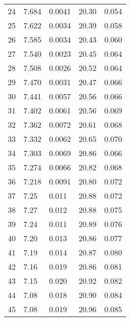 \begin{table}
\begin{tabular}{c|ll|ll}
24 & 7.684 & 0.0041 & 20.30 & 0.054 \\
25 & 7.622 & 0.0034 & 20.39 & 0.058 \\
26 & 7.585 & 0.0034 & 20.43 & 0.060 \\
27 & 7.540 & 0.0023 & 20.45 & 0.064 \\
28 & 7.508 & 0.0026 & 20.52 & 0.064 \\
29 & 7.470 & 0.0031 & 20.47 & 0.066 \\
30 & 7.441 & 0.0057 & 20.56 & 0.066 \\
31 & 7.402 & 0.0061 & 20.56 & 0.069 \\
32 & 7.362 & 0.0072 & 20.61 & 0.068 \\
33 & 7.332 & 0.0062 & 20.65 & 0.070 \\
34 & 7.303 & 0.0069 & 20.86 & 0.066 \\
35 & 7.274 & 0.0066 & 20.82 & 0.068 \\
36 & 7.218 & 0.0091 & 20.80 & 0.072 \\
37 & 7.25 & 0.011 & 20.88 & 0.072 \\
38 & 7.27 & 0.012 & 20.88 & 0.075 \\
39 & 7.24 & 0.011 & 20.89 & 0.076 \\
40 & 7.20 & 0.013 & 20.86 & 0.077 \\
41 & 7.19 & 0.014 & 20.87 & 0.080 \\
42 & 7.16 & 0.019 & 20.86 & 0.081 \\
43 & 7.15 & 0.020 & 20.92 & 0.082 \\
44 & 7.08 & 0.018 & 20.90 & 0.084 \\
45 & 7.08 & 0.019 & 20.96 & 0.085 \\
               \hline
        \end{tabular}
    \end{table}
    \clearpage

